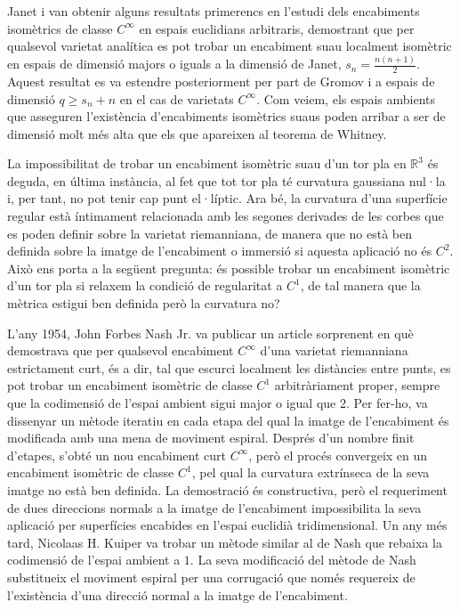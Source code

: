 Janet i \citet{cartan1927} van obtenir alguns resultats primerencs en l'estudi dels encabiments isomètrics de classe $C^\infty$ en espais euclidians arbitraris, demostrant que per qualsevol varietat analítica es pot trobar un encabiment suau localment isomètric en espais de dimensió majors o iguals a la dimensió de Janet, $s_n = \frac{n(n+1)}{2}$. Aquest resultat es va estendre posteriorment per part de Gromov i \citet{rokhlin1970} a espais de dimensió $q\ge s_n+n$ en el cas de varietats $C^\infty$. Com veiem, els espais ambients que asseguren l'existència d'encabiments isomètrics suaus poden arribar a ser de dimensió molt més alta que els que apareixen al teorema de Whitney.

La impossibilitat de trobar un encabiment isomètric suau d'un tor pla en $\mathbb R^3$ és deguda, en última instància, al fet que tot tor pla té curvatura gaussiana nul·la i, per tant, no pot tenir cap punt el·líptic. Ara bé, la curvatura d'una superfície regular està íntimament relacionada amb les segones derivades de les corbes que es poden definir sobre la varietat riemanniana, de manera que no està ben definida sobre la imatge de l'encabiment o immersió si aquesta aplicació no és $C^2$. Això ens porta a la següent pregunta: és possible trobar un encabiment isomètric d'un tor pla si relaxem la condició de regularitat a $C^1$, de tal manera que la mètrica estigui ben definida però la curvatura no?

L'any 1954, John Forbes Nash Jr. va publicar un article sorprenent en què demostrava que per qualsevol encabiment $C^\infty$ d'una varietat riemanniana estrictament curt, és a dir, tal que escurci localment les distàncies entre punts, es pot trobar un encabiment isomètric de classe $C^1$ arbitràriament proper, sempre que la codimensió de l'espai ambient sigui major o igual que 2. Per fer-ho, va dissenyar un mètode iteratiu en cada etapa del qual la imatge de l'encabiment és modificada amb una mena de moviment espiral. Després d'un nombre finit d'etapes, s'obté un nou encabiment curt $C^\infty$, però el procés convergeix en un encabiment isomètric de classe $C^1$, pel qual la curvatura extrínseca de la seva imatge no està ben definida. La demostració és constructiva, però el requeriment de dues direccions normals a la imatge de l'encabiment impossibilita la seva aplicació per superfícies encabides en l'espai euclidià tridimensional. Un any més tard, Nicolaas H. Kuiper va trobar un mètode similar al de Nash que rebaixa la codimensió de l'espai ambient a $1$. La seva modificació del mètode de Nash substitueix el moviment espiral per una corrugació que només requereix de l'existència d'una direcció normal a la imatge de l'encabiment.

